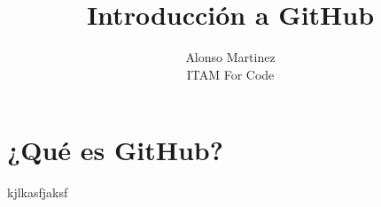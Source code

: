 \documentclass[spanish, 12pt, a4paper]{article}
\title{Introducción a GitHub}
\author{Alonso Martinez \\ ITAM For Code}
\begin{document}
\maketitle

\section{¿Qué es GitHub?}
kjlkasfjaksf
\end{document}
